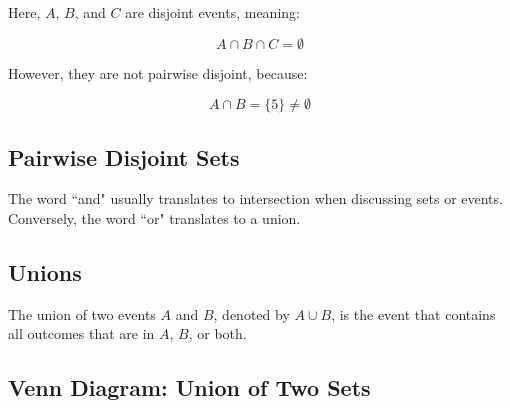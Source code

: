 \documentclass{article}
\begin{document}
Here, \(A\), \(B\), and \(C\) are disjoint events, meaning:

\[
A \cap B \cap C = \emptyset
\]

However, they are not pairwise disjoint, because:

\[
A \cap B = \{5\} \neq \emptyset
\]

\subsection*{Pairwise Disjoint Sets}

\begin{center}
\end{center}


The word ``and" usually translates to intersection when discussing sets or events. Conversely, the word ``or" translates to a union.

\subsection*{Unions}

The union of two events \(A\) and \(B\), denoted by \(A \cup B\), is the event that contains all outcomes that are in \(A\), \(B\), or both.

\subsection*{Venn Diagram: Union of Two Sets}

\begin{center}
\end{center}
\end{document}
